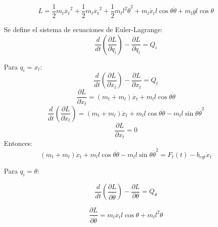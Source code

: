 \documentclass{article}
\begin{document}
            \begin{equation}\label{eq:lagrange3}
                L = \frac{1}{2}m_t\dot{x_t}^2+\frac{1}{2}m_l\dot{x_t}^2
                +\frac{1}{2}m_ll^2\dot{\theta}^2
                +m_l\dot{x_t}l\cos{\theta}\dot{\theta}
                +m_lgl\cos{\theta}
            \end{equation}

            Se define el sistema de ecuaciones de Euler-Lagrange:
            \begin{equation}\label{eq:euler1}
                \frac{d}{dt}\left(\frac{\partial L}{\partial \dot{q}_i}\right)-\frac{\partial L}{\partial q_i}=Q_i
            \end{equation}

            Para \(q_i = x_t\):
            \begin{equation}\label{eq:euler2}
                \frac{d}{dt}\left(\frac{\partial L}{\partial \dot{x}_t}\right)-\frac{\partial L}{\partial x_t}=Q_t
            \end{equation}
            \begin{equation}
                \frac{\partial L}{\partial \dot{x}_t}= (m_t+m_l)\dot{x}_t+m_ll\cos{\theta}\dot{\theta}
            \end{equation}
            \begin{equation}            
                    \frac{d}{dt}\left(\frac{\partial L}{\partial \dot{x}_t}\right)= 
                    (m_t+m_l)\ddot{x}_t+m_l l\cos{\theta}\ddot{\theta}-m_ll\sin{\theta}\dot{\theta}^2
            \end{equation}
            \begin{equation}
                \frac{\partial L}{\partial x_t}=0
            \end{equation}
            Entonces:
            \begin{equation}
                (m_t+m_l)\ddot{x}_t+m_l l\cos{\theta}\ddot{\theta}-m_l l\sin{\theta}\dot{\theta}^2=F_t(t)-b_{eqt} \dot{x}_t
            \end{equation}

            Para \(q_i = \theta\):

            \begin{equation}\label{eq:euler3}
                \frac{d}{dt}\left(\frac{\partial L}{\partial \dot{\theta}}\right)-\frac{\partial L}{\partial \theta}=Q_{\theta}
            \end{equation}

            \begin{equation}
                \frac{\partial L}{\partial \dot{\theta}}=m_l\dot{x_t}l\cos{\theta}+m_ll^2\dot{\theta}
            \end{equation}
\end{document}
